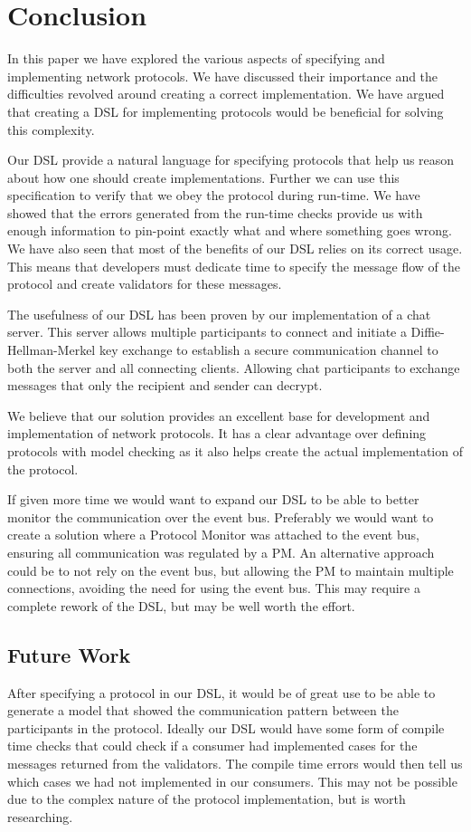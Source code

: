 \section{Conclusion}
In this paper we have explored the various aspects of specifying and implementing network protocols. We have discussed their importance and the difficulties revolved around creating a correct implementation. We have argued that creating a DSL for implementing protocols would be beneficial for solving this complexity.

Our DSL provide a natural language for specifying protocols that help us reason about how one should create implementations. Further we can use this specification to verify that we obey the protocol during run-time. We have showed that the errors generated from the run-time checks provide us with enough information to pin-point exactly what and where something goes wrong. We have also seen that most of the benefits of our DSL relies on its correct usage. This means that developers must dedicate time to specify the message flow of the protocol and create validators for these messages.

The usefulness of our DSL has been proven by our implementation of a chat server. This server allows multiple participants to connect and initiate a Diffie-Hellman-Merkel key exchange to establish a secure communication channel to both the server and all connecting clients. Allowing chat participants to exchange messages that only the recipient and sender can decrypt.

We believe that our solution provides an excellent base for development and implementation of network protocols. It has a clear advantage over defining protocols with model checking as it also helps create the actual implementation of the protocol.   

If given more time we would want to expand our DSL to be able to better monitor the communication over the event bus. Preferably we would want to create a solution where a Protocol Monitor was attached to the event bus, ensuring all communication was regulated by a PM. An alternative approach could be to not rely on the event bus, but allowing the PM to maintain multiple connections, avoiding the need for using the event bus. This may require a complete rework of the DSL, but may be well worth the effort.


\subsection{Future Work}
After specifying a protocol in our DSL, it would be of great use to be able to generate a model that showed the communication pattern between the participants in the protocol.
Ideally our DSL would have some form of compile time checks that could check if a consumer had implemented cases for the messages returned from the validators. The compile time errors would then tell us which cases we had not implemented in our consumers. This may not be possible due to the complex nature of the protocol implementation, but is worth researching.

